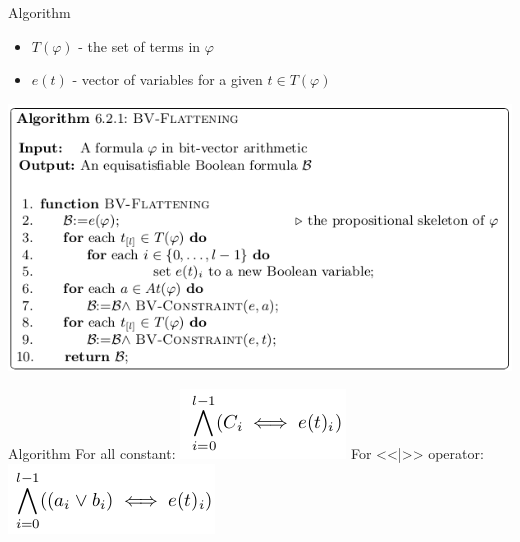 \documentclass{beamer}
\begin{document}
\begin{frame}{Algorithm}
\begin{itemize}
\item $T(\varphi)$ - the set of terms in $\varphi$
\item $e(t)$ - vector of variables for a given $t \in T(\varphi)$
\end{itemize}
\includegraphics[scale=0.5]{algo.png}\newline
\end{frame}

\begin{frame}{Algorithm}
For all constant:\newline
\includegraphics[scale=0.5]{skel.png}\newline
For <<|>> operator:\newline
\includegraphics[scale=0.5]{or3.png}\newline
\end{frame}
\end{document}
